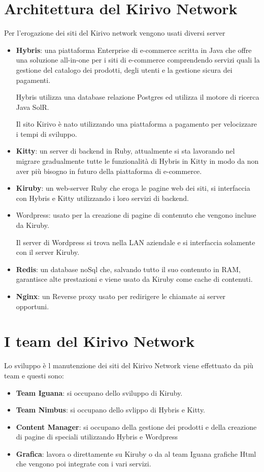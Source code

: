 \section{Architettura del Kirivo Network}
Per l'erogazione dei siti del Kirivo network vengono usati diversi server
\begin{itemize}
\item {\bf Hybris}: una piattaforma Enterprise di e-commerce scritta in Java che offre una soluzione all-in-one per i siti 
di e-commerce comprendendo servizi quali la gestione del catalogo dei prodotti, degli utenti e la 
gestione sicura dei pagamenti.

Hybris utilizza una database relazione Postgres ed utilizza il motore di ricerca Java SolR.

Il sito Kirivo è nato utilizzando una piattaforma a pagamento per velocizzare i tempi di sviluppo.
\item {\bf Kitty}: un server di backend in Ruby, attualmente si sta lavorando nel migrare gradualmente tutte le funzionalità
di Hybris in Kitty in modo da non aver più bisogno in futuro della piattaforma di e-commerce.
\item {\bf Kiruby}: un web-server Ruby che eroga le pagine web dei siti, si interfaccia con Hybris e Kitty utilizzando i loro
servizi di backend. 
\item Wordpress: usato per la creazione di pagine di contenuto che vengono incluse da Kiruby.

Il server di Wordpress si trova nella LAN aziendale e si interfaccia solamente con il server Kiruby.
\item {\bf Redis}: un database noSql che, salvando tutto il suo contenuto in RAM, garantisce alte prestazioni
e viene usato da Kiruby come cache di contenuti. 
\item {\bf Nginx}: un Reverse proxy usato per redirigere le chiamate ai server opportuni.
\end{itemize}

\section{I team del Kirivo Network}
Lo sviluppo è l manutenzione dei siti del Kirivo Network viene effettuato da più team e questi sono:
\begin{itemize}
\item {\bf Team Iguana}: si occupano dello sviluppo di Kiruby.
\item {\bf Team Nimbus}: si occupano dello svlippo di Hybris e Kitty.
\item {\bf Content Manager}: si occupano della gestione dei prodotti e della creazione di pagine di speciali 
utilizzando Hybris e Wordpress
\item {\bf Grafica}: lavora o direttamente su Kiruby o da al team Iguana grafiche Html che vengono poi integrate con i 
vari servizi.
\end{itemize}

